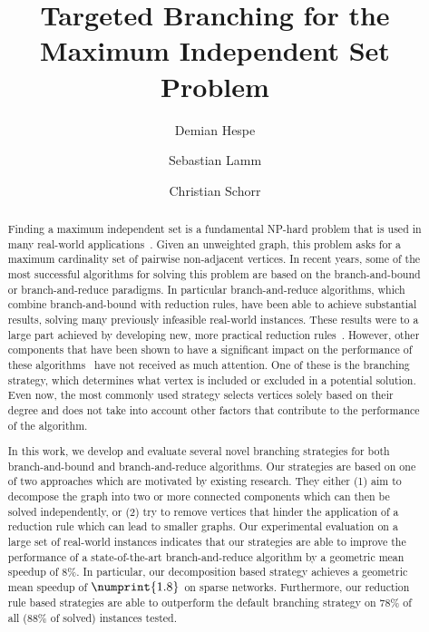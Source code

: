 \documentclass[a4paper,UKenglish,cleveref, autoref, thm-restate]{lipics-v2021}
\title{Targeted Branching for the Maximum Independent Set Problem} %
\author{Demian Hespe}{Karlsruhe Institute of Technology, Institute for
  Theoretical Informatics, Germany}{hespe@kit.edu}{https://orcid.org/0000-0001-6232-2951}{}
\author{Sebastian Lamm}{Karlsruhe Institute of Technology, Institute for
  Theoretical Informatics, Germany}{lamm@kit.edu}{}{\todo{Add funding}}
\author{Christian Schorr}{Karlsruhe Institute of Technology, Institute for
  Theoretical Informatics, Germany}{christian.schorr@student.kit.edu}{}{}
\begin{document}
\maketitle

\begin{abstract}
  Finding a maximum independent set is a fundamental NP-hard problem that is used in many real-world applications~\cite{BIO1,BIO2,RP,NW,CG}.
Given an unweighted graph, this problem asks for a maximum cardinality set of pairwise non-adjacent vertices.
In recent years, some of the most successful algorithms for solving this problem are based on the branch-and-bound or branch-and-reduce paradigms.
In particular branch-and-reduce algorithms, which combine branch-and-bound with reduction rules, have been able to achieve substantial results, solving many previously infeasible real-world instances.
These results were to a large part achieved by developing new, more practical reduction rules~\cite{alsahafy2020computing,ChangKern,dahlum2016accelerating,hespe2019scalable}.
However, other components that have been shown to have a significant impact on the performance of these algorithms~\cite{AkibaIwata} have not received as much attention.
One of these is the branching strategy, which determines what vertex is included or excluded in a potential solution.
Even now, the most commonly used strategy selects vertices solely based on their degree and does not take into account other factors that contribute to the performance of the algorithm.

In this work, we develop and evaluate several novel branching strategies for both branch-and-bound and branch-and-reduce algorithms.
Our strategies are based on one of two approaches which are motivated by existing research. 
They either (1) aim to decompose the graph into two or more connected components which can then be solved independently, or (2) try to remove vertices that hinder the application of a reduction rule which can lead to smaller graphs.
Our experimental evaluation on a large set of real-world instances indicates
that our strategies are able to improve the performance of a state-of-the-art
branch-and-reduce algorithm by a geometric mean speedup of $8\%$. In particular, our
decomposition based strategy achieves a geometric mean speedup of $\numprint{1.8}$ on sparse networks.
Furthermore, our reduction rule based strategies are able to outperform the
default branching strategy on $78\%$ of all
($88\%$ of solved)
instances tested.

\end{abstract}
\end{document}
